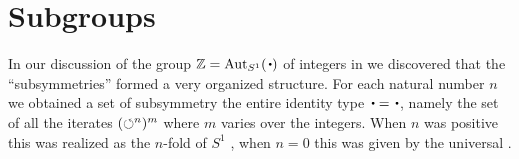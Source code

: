 









\section{Subgroups}
\label{sec:subgroups}
In our discussion of the group $\ZZ=\aut_{S^1}(\base)$ of integers in we discovered that the ``subsymmetries'' formed a very organized structure.  For each natural number $n$ we obtained a set of subsymmetry the entire identity type $\base=\base$, namely the set of all the iterates $(\circlearrowleft^{n})^m$ where $m$ varies over the integers.  When $n$ was positive this was realized as the $n$-fold \covering of $S^1$ , when $n=0$ this was given by the universal \covering.  

